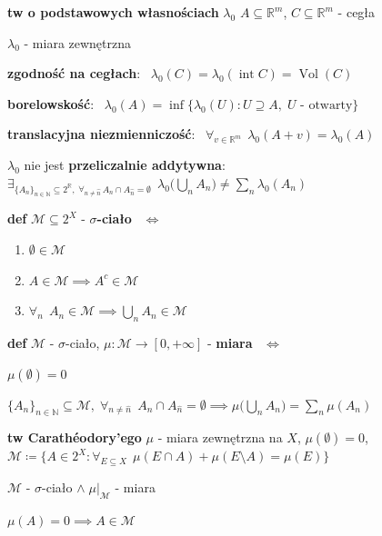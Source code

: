 \documentclass[a4paper,12pt]{article}
\begin{document}
\bigskip
\textbf{tw o podstawowych własnościach} \(\lambda_0\) \; \(A \subseteq \mathbb{R}^m\), \; \(C \subseteq \mathbb{R}^m\) - cegła
\begin{podpunkty}
    \item \(\lambda_0\) - miara zewnętrzna
    \item \textbf{zgodność na cegłach}: \, \(\lambda_0(C) = \lambda_0(\operatorname{int} C) = \operatorname{Vol}(C)\)
    \item \textbf{borelowskość}: \, \(\lambda_0(A) = \inf \{\lambda_0(U) : U \supseteq A, \; U \text{ - otwarty}\}\)
    \item \textbf{translacyjna niezmienniczość}: \, \(\forall_{v \in \mathbb{R}^m} \;\, \lambda_0(A + v) = \lambda_0(A)\)
    \item \(\lambda_0\) nie jest \textbf{przeliczalnie addytywna}: \, \(\exists_{\{A_n\}_{n \in \mathbb{N}} \subseteq 2^{\mathbb{R}}, \; \forall_{n \neq \hat{n}} \, A_n \cap A_{\hat{n}} = \emptyset} \;\, \lambda_0\big(\bigcup_n A_n\big) \neq \sum_n \lambda_0(A_n)\)\end{podpunkty}

\bigskip
\textbf{def} \; \(\mathcal{M} \subseteq 2^X\) - \textbf{\(\sigma\)-ciało} \, \(\iff\)
\begin{enumerate}[label=\roman*), leftmargin=1.9em, itemsep=0.2em, topsep=0.2em, parsep=0pt, partopsep=0pt]
    \item \(\emptyset \in \mathcal{M}\)
    \item \(A \in \mathcal{M} \implies A^c \in \mathcal{M}\)
    \item \(\forall_n \;\, A_n \in \mathcal{M} \implies \bigcup_n A_n \in \mathcal{M}\)
\end{enumerate}

\bigskip
\textbf{def} \; \(\mathcal{M}\) - \(\sigma\)-ciało, \; \(\mu: \mathcal{M} \to [0, +\infty]\) - \textbf{miara} \, \(\iff\)
\begin{podpunkty}
    \item \(\mu(\emptyset) = 0\)
    \item \(\{A_n\}_{n \in \mathbb{N}} \subseteq \mathcal{M}, \; \forall_{n \neq \hat{n}} \;\, A_n \cap A_{\hat{n}} = \emptyset \implies \mu\big(\bigcup_n A_n\big) = \sum_n \mu(A_n)\)
\end{podpunkty}

\bigskip
\textbf{tw Carathéodory'ego} \; \(\mu\) - miara zewnętrzna na \(X\), \; \(\mu(\emptyset) = 0\), \; \(\mathcal{M} \coloneqq \{A \in 2^X : \forall_{E \subseteq X} \;\, \mu(E \cap A) + \mu(E \setminus A) = \mu(E)\}\)
\begin{podpunkty}
    \item \(\mathcal{M}\) - \(\sigma\)-ciało \(\land \; \mu|_{\mathcal{M}}\) - miara
    \item \(\mu(A) = 0 \implies A \in \mathcal{M}\)
\end{podpunkty}

\newpage
{}
\end{document}
